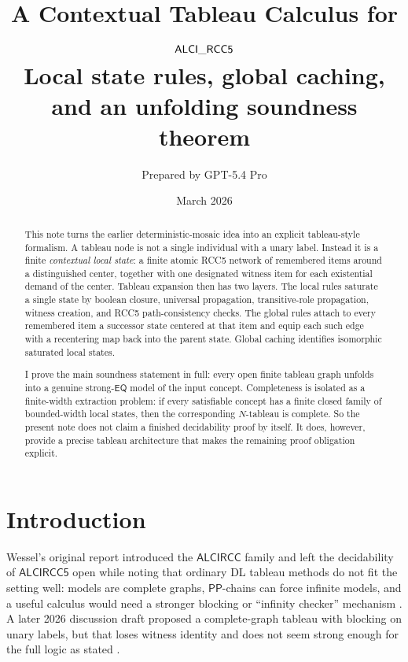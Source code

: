 \documentclass[11pt]{article}
\title{\textbf{A Contextual Tableau Calculus for $\mathsf{ALCI\_RCC5}$}\\[0.4em]
\large Local state rules, global caching, and an unfolding soundness theorem}
\author{Prepared by GPT-5.4 Pro}
\date{March 2026}
\theoremstyle{definition}
\newcommand{\Eq}{\mathsf{EQ}}
\newcommand{\Pp}{\mathsf{PP}}
\begin{document}
\maketitle

\begin{abstract}
This note turns the earlier deterministic-mosaic idea into an explicit tableau-style formalism. A tableau node is not a single individual with a unary label. Instead it is a finite \emph{contextual local state}: a finite atomic RCC5 network of remembered items around a distinguished center, together with one designated witness item for each existential demand of the center. Tableau expansion then has two layers. The local rules saturate a single state by boolean closure, universal propagation, transitive-role propagation, witness creation, and RCC5 path-consistency checks. The global rules attach to every remembered item a successor state centered at that item and equip each such edge with a recentering map back into the parent state. Global caching identifies isomorphic saturated local states.

I prove the main soundness statement in full: every open finite tableau graph unfolds into a genuine strong-$\Eq$ model of the input concept. Completeness is isolated as a finite-width extraction problem: if every satisfiable concept has a finite closed family of bounded-width local states, then the corresponding $N$-tableau is complete. So the present note does not claim a finished decidability proof by itself. It does, however, provide a precise tableau architecture that makes the remaining proof obligation explicit.
\end{abstract}

\section{Introduction}

Wessel's original report introduced the $\mathsf{ALCIRCC}$ family and left the decidability of $\mathsf{ALCIRCC5}$ open while noting that ordinary DL tableau methods do not fit the setting well: models are complete graphs, $\Pp$-chains can force infinite models, and a useful calculus would need a stronger blocking or ``infinity checker'' mechanism \cite{Wessel2003}. A later 2026 discussion draft proposed a complete-graph tableau with blocking on unary labels, but that loses witness identity and does not seem strong enough for the full logic as stated \cite{Claude2026}.
\end{document}
